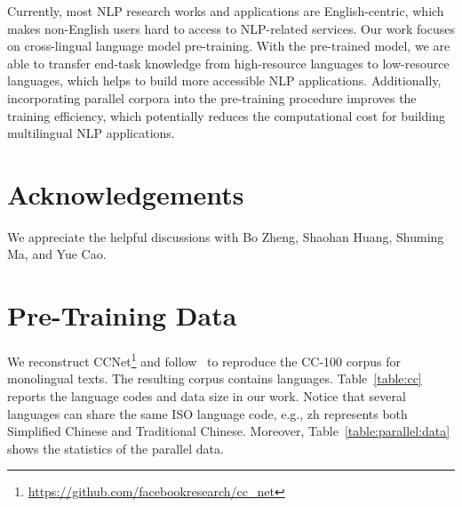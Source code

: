 \documentclass[11pt,a4paper]{article}
\begin{document}
Currently, most NLP research works and applications are English-centric, which makes non-English users hard to access to NLP-related services. Our work focuses on cross-lingual language model pre-training. With the pre-trained model, we are able to transfer end-task knowledge from high-resource languages to low-resource languages, which helps to build more accessible NLP applications.
Additionally, incorporating parallel corpora into the pre-training procedure improves the training efficiency, which potentially reduces the computational cost for building multilingual NLP applications.

\section*{Acknowledgements}
We appreciate the helpful discussions with Bo Zheng, Shaohan Huang, Shuming Ma, and Yue Cao.





\newpage
\appendix

\section{Pre-Training Data}

We reconstruct CCNet\footnote{\url{https://github.com/facebookresearch/cc_net}} and follow~\cite{xlmr} to reproduce the CC-100 corpus for monolingual texts.
The resulting corpus contains  languages.
Table~\ref{table:cc} reports the language codes and data size in our work.
Notice that several languages can share the same ISO language code, e.g., zh represents both Simplified Chinese and Traditional Chinese.
Moreover, Table~\ref{table:parallel:data} shows the statistics of the parallel data.
\end{document}
